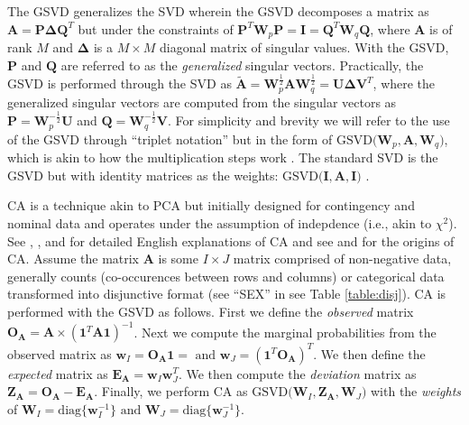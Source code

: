 \documentclass[12pt]{article}
\begin{document}
The GSVD generalizes the SVD wherein the GSVD decomposes a matrix as
\({\mathbf A} = {\mathbf P} {\boldsymbol \Delta} {\mathbf Q}^{T}\) but
under the constraints of
\({\mathbf P}^{T}{\mathbf W}_{p}{\mathbf P} = {\mathbf I} = {\mathbf Q}^{T}{\mathbf W}_{q}{\mathbf Q}\),
where \({\mathbf A}\) is of rank \(M\) and \({\boldsymbol \Delta}\) is a
\(M \times M\) diagonal matrix of singular values. With the GSVD,
\({\mathbf P}\) and \({\mathbf Q}\) are referred to as the
\emph{generalized} singular vectors. Practically, the GSVD is performed
through the SVD as
\(\widetilde{\mathbf A} = {\mathbf W}_{p}^{\frac{1}{2}}{\mathbf A}{\mathbf W}_{q}^{\frac{1}{2}} = {\mathbf U} {\boldsymbol \Delta} {\mathbf V}^{T}\),
where the generalized singular vectors are computed from the singular
vectors as \({\mathbf P} = {\mathbf W}_{p}^{-\frac{1}{2}}{\mathbf U}\)
and \({\mathbf Q} = {\mathbf W}_{q}^{-\frac{1}{2}}{\mathbf V}\). For
simplicity and brevity we will refer to the use of the GSVD through
``triplet notation'' \citep{holmes_multivariate_2008} but in the form of
\(\mathrm{GSVD(} {\mathbf W}_{p}, {\mathbf A}, {\mathbf W}_{q} \mathrm{)}\),
which is akin to how the multiplication steps work \citep[see
also][]{beaton2018generalization}. The standard SVD is the GSVD but with
identity matrices as the weights:
\(\mathrm{GSVD(} {\mathbf I}, {\mathbf A}, {\mathbf I} \mathrm{)}\)
\citep[see also][]{takane_relationships_2003}.

CA is a technique akin to PCA but initially designed for contingency and
nominal data and operates under the assumption of indepdence (i.e., akin
to \(\chi^2\)). See \citet{greenacre_theory_1984},
\citet{greenacre_correspondence_2010-1}, and
\citet{lebart_multivariate_1984} for detailed English explanations of CA
and see \citet{escofier-cordier_analyse_1965} and
\citet{benzecri_analyse_1973} for the origins of CA. Assume the matrix
\({\mathbf A}\) is some \(I \times J\) matrix comprised of non-negative
data, generally counts (co-occurences between rows and columns) or
categorical data transformed into disjunctive format (see ``SEX'' in see
Table \ref{table:disj}). CA is performed with the GSVD as follows. First
we define the \emph{observed} matrix
\({\mathbf O}_{\mathbf A} = {\mathbf A} \times ({\mathbf 1}^{T}{\mathbf A} {\mathbf 1})^{-1}\).
Next we compute the marginal probabilities from the observed matrix as
\({\mathbf w}_{I} = {\mathbf O}_{\mathbf A}{\mathbf 1} = \text{ and } {\mathbf w}_{J} = ({\mathbf 1}^{T}{\mathbf O}_{\mathbf A})^{T}\).
We then define the \emph{expected} matrix as
\({\mathbf E}_{\mathbf A} = {\mathbf w}_{I}{\mathbf w}_{J}^{T}\). We
then compute the \emph{deviation} matrix as
\({\mathbf Z}_{\mathbf A} = {\mathbf O}_{\mathbf A} - {\mathbf E}_{\mathbf A}\).
Finally, we perform CA as
\(\mathrm{GSVD(} {\mathbf W}_{I}, {\mathbf Z}_{\mathbf A}, {\mathbf W}_{J} \mathrm{)}\)
with the \emph{weights} of
\({\mathbf W}_{I} = \mathrm{diag\{} {\mathbf w}_{I}^{-1} \mathrm{\}} \text{ and } {\mathbf W}_{J} = \mathrm{diag\{} {\mathbf w}_{J}^{-1} \mathrm{\}}\).
\end{document}

